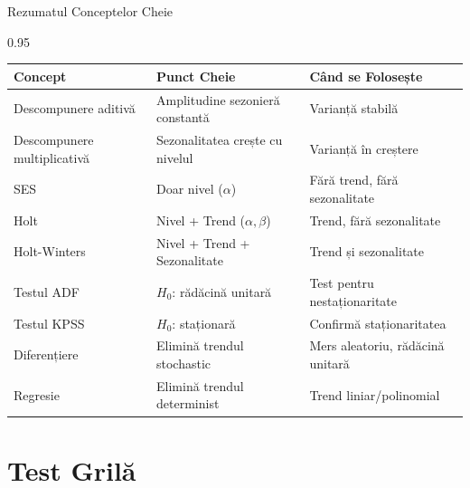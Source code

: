 \documentclass[9pt, aspectratio=169, t]{beamer}
\begin{document}
\begin{frame}{Rezumatul Conceptelor Cheie}
    \begin{cminipage}{0.95\textwidth}
    \begin{center}
    \small
    \begin{tabular}{lll}
        \toprule
        \textbf{Concept} & \textbf{Punct Cheie} & \textbf{Când se Folosește} \\
        \midrule
        Descompunere aditivă & Amplitudine sezonieră constantă & Varianță stabilă \\
        Descompunere multiplicativă & Sezonalitatea crește cu nivelul & Varianță în creștere \\
        SES & Doar nivel ($\alpha$) & Fără trend, fără sezonalitate \\
        Holt & Nivel + Trend ($\alpha, \beta$) & Trend, fără sezonalitate \\
        Holt-Winters & Nivel + Trend + Sezonalitate & Trend și sezonalitate \\
        \midrule
        Testul ADF & $H_0$: rădăcină unitară & Test pentru nestaționaritate \\
        Testul KPSS & $H_0$: staționară & Confirmă staționaritatea \\
        \midrule
        Diferențiere & Elimină trendul stochastic & Mers aleatoriu, rădăcină unitară \\
        Regresie & Elimină trendul determinist & Trend liniar/polinomial \\
        \bottomrule
    \end{tabular}
    \end{center}
    \end{cminipage}
\end{frame}

\section{Test Grilă}
\end{document}
